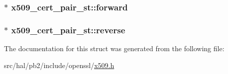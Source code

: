 \subsubsection[{\texorpdfstring{forward}{forward}}]{$\ast$ x509\+\_\+cert\+\_\+pair\+\_\+st\+::forward}\hypertarget{structx509__cert__pair__st_a6187bc9b7943e8089be772b2657cfc65}{}\label{structx509__cert__pair__st_a6187bc9b7943e8089be772b2657cfc65}
\subsubsection[{\texorpdfstring{reverse}{reverse}}]{$\ast$ x509\+\_\+cert\+\_\+pair\+\_\+st\+::reverse}\hypertarget{structx509__cert__pair__st_acf854c09163ea3c9a79890aa13dee3bd}{}\label{structx509__cert__pair__st_acf854c09163ea3c9a79890aa13dee3bd}


The documentation for this struct was generated from the following file\+:\begin{DoxyCompactItemize}
\item 
src/hal/pb2/include/openssl/\hyperlink{x509_8h}{x509.\+h}\end{DoxyCompactItemize}
